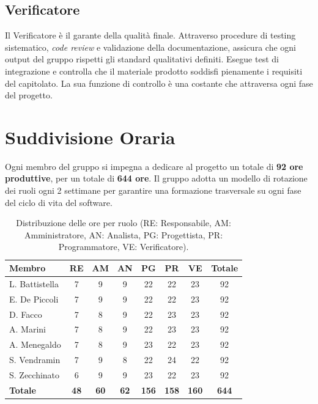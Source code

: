 \documentclass[a4paper, 10pt, colorlinks=true, linkcolor=black, urlcolor=blue, citecolor=blue, hidelinks]{article}
\begin{document}
\subsection{Verificatore}
Il Verificatore è il garante della qualità finale. Attraverso procedure di testing sistematico, \textit{code review} e validazione della documentazione, assicura che ogni output del gruppo rispetti gli standard qualitativi definiti. Esegue test di integrazione e controlla che il materiale prodotto soddisfi pienamente i requisiti del capitolato. La sua funzione di controllo è una costante che attraversa ogni fase del progetto.

\section{Suddivisione Oraria}
Ogni membro del gruppo si impegna a dedicare al progetto un totale di \textbf{92 ore produttive}, per un totale di \textbf{644 ore}. Il gruppo adotta un modello di rotazione dei ruoli ogni 2 settimane per garantire una formazione trasversale su ogni fase del ciclo di vita del software.

\begin{table}[H]
\centering
\small
\begin{tabularx}{\textwidth}{|X|c|c|c|c|c|c|c|}
\hline
\textbf{Membro} & \textbf{RE} & \textbf{AM} & \textbf{AN} & \textbf{PG} & \textbf{PR} & \textbf{VE} & \textbf{Totale} \\
\hline
L. Battistella & 7 & 9 & 9 & 22 & 22 & 23 & 92 \\ \hline
E. De Piccoli  & 7 & 9 & 9 & 22 & 22 & 23 & 92 \\ \hline
D. Facco       & 7 & 8 & 9 & 22 & 23 & 23 & 92 \\ \hline
A. Marini      & 7 & 8 & 9 & 22 & 23 & 23 & 92 \\ \hline
A. Menegaldo   & 7 & 8 & 9 & 23 & 22 & 23 & 92 \\ \hline
S. Vendramin   & 7 & 9 & 8 & 22 & 24 & 22 & 92 \\ \hline
S. Zecchinato  & 6 & 9 & 9 & 23 & 22 & 23 & 92 \\ \hline
\textbf{Totale} & \textbf{48} & \textbf{60} & \textbf{62} & \textbf{156} & \textbf{158} & \textbf{160} & \textbf{644} \\ \hline
\end{tabularx}
\caption{Distribuzione delle ore per ruolo (RE: Responsabile, AM: Amministratore, AN: Analista, PG: Progettista, PR: Programmatore, VE: Verificatore).}
\end{table}
\end{document}
